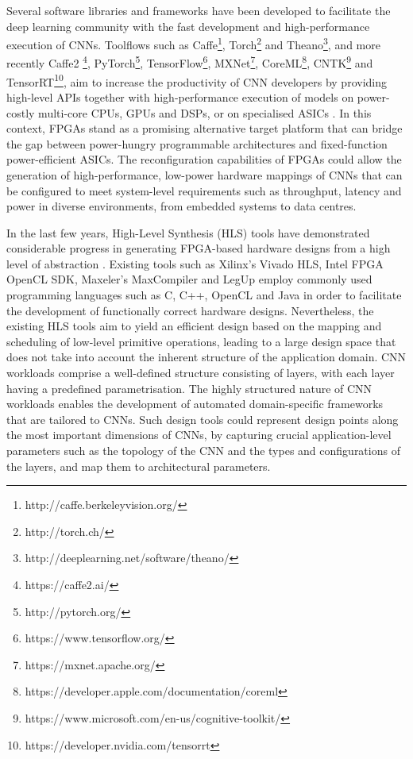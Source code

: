 \documentclass[format=acmsmall, review=false, screen=true]{acmart}
\begin{document}
Several software libraries and frameworks have been developed to facilitate the {\color{black}deep learning} community with the fast development and high-performance execution of CNNs. Toolflows such as Caffe\footnote{http://caffe.berkeleyvision.org/}, Torch\footnote{http://torch.ch/} and Theano\footnote{http://deeplearning.net/software/theano/}, {\color{black}and more recently Caffe2 \footnote{https://caffe2.ai/}, PyTorch\footnote{http://pytorch.org/}, TensorFlow\footnote{https://www.tensorflow.org/}, MXNet\footnote{https://mxnet.apache.org/}, CoreML\footnote{https://developer.apple.com/documentation/coreml}, CNTK\footnote{https://www.microsoft.com/en-us/cognitive-toolkit/} and TensorRT\footnote{https://developer.nvidia.com/tensorrt},} aim to increase the productivity of CNN developers by providing high-level APIs together with high-performance execution of models on power-costly multi-core CPUs, GPUs and DSPs, {\color{black}or on specialised ASICs \cite{Jouppi2017}}. In this context, FPGAs stand as a {\color{black}promising} alternative target platform that can bridge the gap between power-hungry programmable architectures and fixed-function power-efficient ASICs. The reconfiguration capabilities of FPGAs could allow the generation of high-performance, low-power hardware mappings of CNNs that can be configured to meet system-level requirements such as throughput, latency and power in diverse environments, from embedded systems to data centres.


In the last few years, High-Level Synthesis (HLS) tools have demonstrated considerable progress in generating FPGA-based hardware designs from a high level of abstraction \cite{Inggs_2014}. Existing tools such as Xilinx's Vivado HLS, Intel FPGA OpenCL SDK, Maxeler's MaxCompiler {\color{black}and LegUp \cite{Canis_2013}} employ commonly used programming languages such as C, C++, OpenCL and Java in order to facilitate the development of functionally correct hardware designs. Nevertheless, the existing HLS tools aim to yield an efficient design based on the mapping and scheduling of low-level primitive operations, leading to a large design space that does not take into account the inherent structure of the application domain. CNN workloads comprise a well-defined structure consisting of layers, with each layer having a predefined parametrisation. The highly structured nature of CNN workloads enables the development of automated domain-specific frameworks that are tailored to CNNs. Such design tools could represent design points along the most important dimensions of CNNs, by capturing crucial application-level parameters such as the topology of the CNN and the types and configurations of the layers, and map them to architectural parameters.
\end{document}
